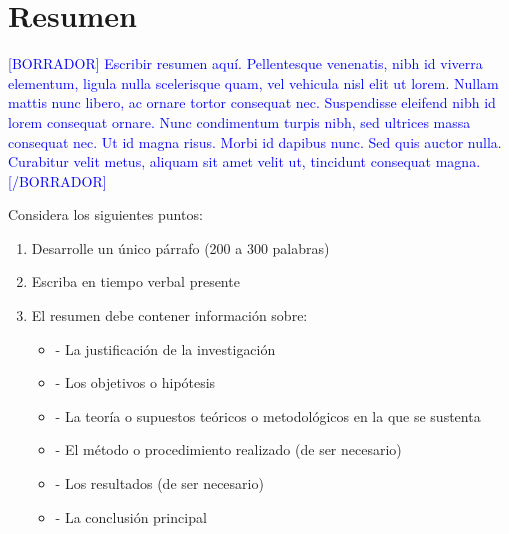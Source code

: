 
\newpage
\clearpage{\pagestyle{empty}\cleardoublepage}
\newpage

\pagestyle{empty}
\newpage
\chapter*{\centering \large Resumen} 

\textcolor{blue}{[BORRADOR] Escribir resumen aquí. Pellentesque venenatis, nibh id viverra elementum, ligula nulla scelerisque quam, vel vehicula nisl elit ut lorem. Nullam mattis nunc libero, ac ornare tortor consequat nec. Suspendisse eleifend nibh id lorem consequat ornare. Nunc condimentum turpis nibh, sed ultrices massa consequat nec. Ut id magna risus. Morbi id dapibus nunc. Sed quis auctor nulla. Curabitur velit metus, aliquam sit amet velit ut, tincidunt consequat magna. [/BORRADOR]}


Considera los siguientes puntos:
\begin{enumerate}
	\item Desarrolle un único párrafo (200 a 300 palabras)
	\item Escriba en tiempo verbal presente
	\item El resumen debe contener información sobre:
	\begin{itemize}
		\item	- La justificación de la investigación
		\item	- Los objetivos o hipótesis
		\item	- La teoría o supuestos teóricos o metodológicos en la que se sustenta
		\item	- El método o procedimiento realizado (de ser necesario)
		\item	- Los resultados (de ser necesario)
		\item	- La conclusión principal
	\end{itemize}
\end{enumerate}